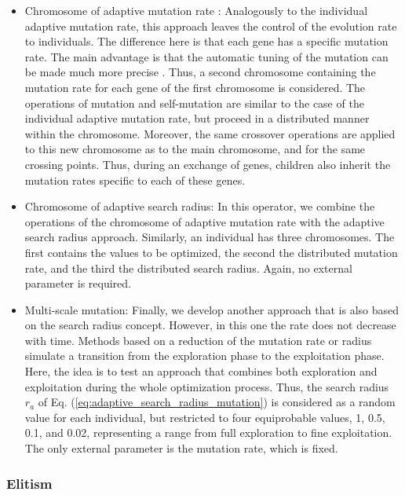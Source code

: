 \documentclass{ametsoc}
\begin{document}
\begin{itemize}
	\item Chromosome of adaptive mutation rate \citep[or \textit{n adaptative mutation rate},][]{Back1992a}: Analogously to the individual adaptive mutation rate, this approach leaves the control of the evolution rate to individuals. The difference here is that each gene has a specific mutation rate. The main advantage is that the automatic tuning of the mutation can be made much more precise \citep{Smith1997a}. Thus, a second chromosome containing the mutation rate for each gene of the first chromosome is considered. The operations of mutation and self-mutation are similar to the case of the individual adaptive mutation rate, but proceed in a distributed manner within the chromosome. Moreover, the same crossover operations are applied to this new chromosome as to the main chromosome, and for the same crossing points. Thus, during an exchange of genes, children also inherit the mutation rates specific to each of these genes.
	
	\item Chromosome of adaptive search radius: In this operator, we combine the operations of the chromosome of adaptive mutation rate with the adaptive search radius approach. Similarly, an individual has three chromosomes. The first contains the values to be optimized, the second the distributed mutation rate, and the third the distributed search radius. Again, no external parameter is required.
	
	\item Multi-scale mutation: Finally, we develop another approach that is also based on the search radius concept. However, in this one the rate does not decrease with time. Methods based on a reduction of the mutation rate or radius simulate a transition from the exploration phase to the exploitation phase. Here, the idea is to test an approach that combines both exploration and exploitation during the whole optimization process. Thus, the search radius $r_{a}$ of Eq. (\ref{eq:adaptive_search_radius_mutation}) is considered as a random value for each individual, but restricted to four equiprobable values, 1, 0.5, 0.1, and 0.02, representing a range from full exploration to fine exploitation. The only external parameter is the mutation rate, which is fixed.
	
\end{itemize}


\subsubsection{Elitism}
\end{document}
